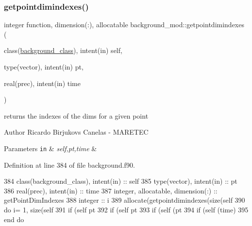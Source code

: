 \subsubsection{\texorpdfstring{getpointdimindexes()}{getpointdimindexes()}}
{\footnotesize\ttfamily integer function, dimension(\+:), allocatable background\+\_\+mod\+::getpointdimindexes (\begin{DoxyParamCaption}\item[{class(\mbox{\hyperlink{structbackground__mod_1_1background__class}{background\+\_\+class}}), intent(in)}]{self,  }\item[{type(vector), intent(in)}]{pt,  }\item[{real(prec), intent(in)}]{time }\end{DoxyParamCaption})\hspace{0.3cm}{\ttfamily [private]}}



returns the indexes of the dims for a given point 

\begin{DoxyAuthor}{Author}
Ricardo Birjukovs Canelas -\/ M\+A\+R\+E\+T\+EC 
\end{DoxyAuthor}

\begin{DoxyParams}[1]{Parameters}
\mbox{\tt in}  & {\em self,pt,time} & \\
\hline
\end{DoxyParams}


Definition at line 384 of file background.\+f90.


\begin{DoxyCode}
384     \textcolor{keywordtype}{class}(background\_class), \textcolor{keywordtype}{intent(in)} :: self
385     \textcolor{keywordtype}{type}(vector), \textcolor{keywordtype}{intent(in)} :: pt
386     \textcolor{keywordtype}{real(prec)}, \textcolor{keywordtype}{intent(in)} :: time
387     \textcolor{keywordtype}{integer}, \textcolor{keywordtype}{allocatable}, \textcolor{keywordtype}{dimension(:)} :: getPointDimIndexes
388     \textcolor{keywordtype}{integer} :: i
389     \textcolor{keyword}{allocate}(getpointdimindexes(\textcolor{keyword}{size}(self%
390     \textcolor{keywordflow}{do} i= 1, \textcolor{keyword}{size}(self%
391         \textcolor{keywordflow}{if} (self%
      pt%
392         \textcolor{keywordflow}{if} (self%
      pt%
393         \textcolor{keywordflow}{if} (self%
      (pt%
394         \textcolor{keywordflow}{if} (self%
      (time)
395 \textcolor{keywordflow}{    end do}
\end{DoxyCode}
\mbox{\label{namespacebackground__mod_a09d61976c4545e8753eb4594044b109d}} 
